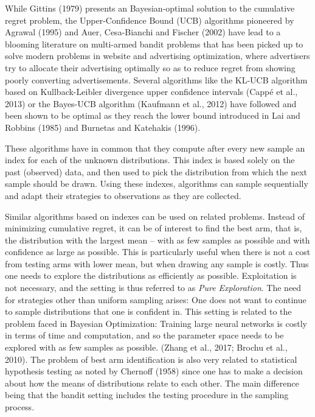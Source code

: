 \documentclass[11pt,]{article}
\begin{document}
While Gittins (1979) presents an Bayesian-optimal solution to the
cumulative regret problem, the Upper-Confidence Bound (UCB) algorithms
pioneered by Agrawal (1995) and Auer, Cesa-Bianchi and Fischer (2002)
have lead to a blooming literature on multi-armed bandit problems that
has been picked up to solve modern problems in website and advertising
optimization, where advertisers try to allocate their advertising
optimally so as to reduce regret from showing poorly converting
advertisements. Several algorithms like the KL-UCB algorithm based on
Kullback-Leibler divergence upper confidence intervals (Cappé et al.,
2013) or the Bayes-UCB algorithm (Kaufmann et al., 2012) have followed
and been shown to be optimal as they reach the lower bound introduced in
Lai and Robbins (1985) and Burnetas and Katehakis (1996).

These algorithms have in common that they compute after every new sample
an index for each of the unknown distributions. This index is based
solely on the past (observed) data, and then used to pick the
distribution from which the next sample should be drawn. Using these
indexes, algorithms can sample sequentially and adapt their strategies
to observations as they are collected.

Similar algorithms based on indexes can be used on related problems.
Instead of minimizing cumulative regret, it can be of interest to find
the best arm, that is, the distribution with the largest mean -- with as
few samples as possible and with confidence as large as possible. This
is particularly useful when there is not a cost from testing arms with
lower mean, but when drawing any sample is costly. Thus one needs to
explore the distributions as efficiently as possible. Exploitation is
not necessary, and the setting is thus referred to as \emph{Pure
Exploration}. The need for strategies other than uniform sampling
arises: One does not want to continue to sample distributions that one
is confident in. This setting is related to the problem faced in
Bayesian Optimization: Training large neural networks is costly in terms
of time and computation, and so the parameter space needs to be explored
with as few samples as possible. (Zhang et al., 2017; Brochu et al.,
2010). The problem of best arm identification is also very related to
statistical hypothesis testing as noted by Chernoff (1958) since one has
to make a decision about how the means of distributions relate to each
other. The main difference being that the bandit setting includes the
testing procedure in the sampling process.
\end{document}
